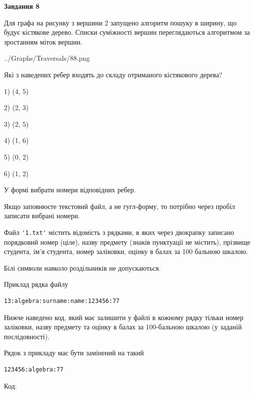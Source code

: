 \documentclass[12pt, ukrainian]{article}
\def\code#1{\Verb!#1!}
\begin{document}
{\begin {large}
{\begin {center}\textbf{Завдання 8}\end {center}}\par
Для графа на рисунку з вершини 2 запущено алгоритм пошуку в ширину, що будує кістякове дерево. Списки суміжності вершин переглядаються алгоритмом за зростанням міток вершин.\par
\begin{center}
	{../Graphs/Traversals/88.png}
\end{center}
\par Які з наведених ребер входять до складу отриманого кістякового дерева?\par
1) (4, 5)\par
2) (2, 3)\par
3) (2, 5)\par
4) (1, 6)\par
5) (0, 2)\par
6) (1, 2)\par
{\vskip 15pt} У формі вибрати номери відповідних ребер.


Якщо заповнюєте текстовий файл, а не гугл-форму, то потрібно через пробіл записа\-ти вибрані номери.\par
\newpage


Файл \code{'1.txt'} містить відомість з рядками, в яких через двокрапку записа\-но поряд\-ковий номер (ціле), назву предмету (знаків пунктуації не містить), прізвище студента, ім'я студента, номер заліковки, оцінку в балах за 100 бальною шкалою.

Білі символи навколо роздільників не допускаються.

Приклад рядка файлу



\begin{verbatim}
13:algebra:surname:name:123456:77
\end{verbatim}


Нижче наведено код, який має залишити у файлі в кожному рядку тільки номер заліковки, назву предмету та оцінку в балах за 100-бальною шкалою (у заданій послі\-дов\-ності).

Рядок з прикладу має бути замінений на такий



\begin{verbatim}
123456:algebra:77
\end{verbatim}




Код:




\end{large}}
\end{document}
